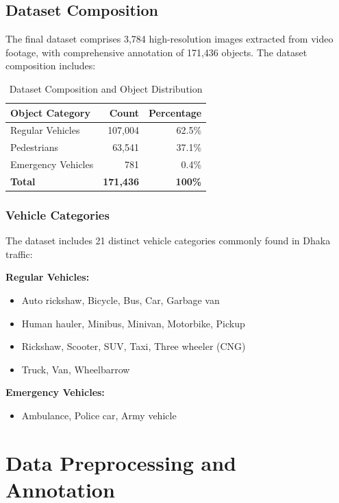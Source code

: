 \subsection{Dataset Composition}

The final dataset comprises 3,784 high-resolution images extracted from video footage, with comprehensive annotation of 171,436 objects. The dataset composition includes:

\begin{table}[h]
\centering
\caption{Dataset Composition and Object Distribution}
\begin{tabular}{|l|r|r|}
\hline
\textbf{Object Category} & \textbf{Count} & \textbf{Percentage} \\
\hline
Regular Vehicles & 107,004 & 62.5\% \\
Pedestrians & 63,541 & 37.1\% \\
Emergency Vehicles & 781 & 0.4\% \\
\hline
\textbf{Total} & \textbf{171,436} & \textbf{100\%} \\
\hline
\end{tabular}
\end{table}

\subsubsection{Vehicle Categories}

The dataset includes 21 distinct vehicle categories commonly found in Dhaka traffic:

\textbf{Regular Vehicles:}
\begin{itemize}
    \item Auto rickshaw, Bicycle, Bus, Car, Garbage van
    \item Human hauler, Minibus, Minivan, Motorbike, Pickup
    \item Rickshaw, Scooter, SUV, Taxi, Three wheeler (CNG)
    \item Truck, Van, Wheelbarrow
\end{itemize}

\textbf{Emergency Vehicles:}
\begin{itemize}
    \item Ambulance, Police car, Army vehicle
\end{itemize}

\section{Data Preprocessing and Annotation}

